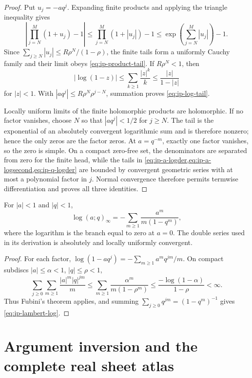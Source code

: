 \begin{proof}
Put \(u_j=-aq^j\).  Expanding finite products and applying the triangle
inequality gives
\[
 \left|\prod_{j=N}^{M}(1+u_j)-1\right|
 \leq\prod_{j=N}^{M}(1+|u_j|)-1
 \leq\exp\left(\sum_{j=N}^{M}|u_j|\right)-1.
\]
Since \(\sum_{j\geq N}|u_j|\leq R\rho^N/(1-\rho)\), the finite tails form a
uniformly Cauchy family and their limit obeys \cref{eq:ip-product-tail}.  If
\(R\rho^N<1\), then
\[
 |\log(1-z)|\leq\sum_{k\geq1}\frac{|z|^k}{k}
 \leq\frac{|z|}{1-|z|}
\]
for \(|z|<1\).  With \(|aq^j|\leq R\rho^N\rho^{j-N}\), summation proves
\cref{eq:ip-log-tail}.

Locally uniform limits of the finite holomorphic products are holomorphic.
If no factor vanishes, choose \(N\) so that \(|aq^j|<1/2\) for \(j\geq N\).
The tail is the exponential of an absolutely convergent logarithmic sum and
is therefore nonzero; hence the only zeros are the factor zeros.  At
\(a=q^{-m}\), exactly one factor vanishes, so the zero is simple.  On a compact
zero-free set, the denominators are separated from zero for the finite head,
while the tails in \cref{eq:ip-a-logder,eq:ip-a-logsecond,eq:ip-q-logder} are
bounded by convergent geometric series with at most a polynomial factor in
\(j\).  Normal convergence therefore permits termwise differentiation and
proves all three identities.
\end{proof}

\begin{lemma}
\label{lem:ip-lambert-log}
For \(|a|<1\) and \(|q|<1\),
\begin{equation}
 \log(a;q)_\infty
 =-\sum_{m\geq1}\frac{a^m}{m(1-q^m)},
 \label{eq:ip-lambert-log}
\end{equation}
where the logarithm is the branch equal to zero at \(a=0\).  The double
series used in its derivation is absolutely and locally uniformly convergent.
\end{lemma}

\begin{proof}
For each factor,
\(\log(1-aq^j)=-\sum_{m\geq1}a^mq^{jm}/m\).  On compact subdiscs
\(|a|\leq\alpha<1\), \(|q|\leq\rho<1\),
\[
 \sum_{j\geq0}\sum_{m\geq1}\frac{|a|^m|q|^{jm}}m
 \leq\sum_{m\geq1}\frac{\alpha^m}{m(1-\rho^m)}
 \leq\frac{-\log(1-\alpha)}{1-\rho}<\infty.
\]
Thus Fubini's theorem applies, and summing
\(\sum_{j\geq0}q^{jm}=(1-q^m)^{-1}\) gives
\cref{eq:ip-lambert-log}.
\end{proof}

\section{Argument inversion and the complete real sheet atlas}
\label{sec:ip-argument-atlas}


